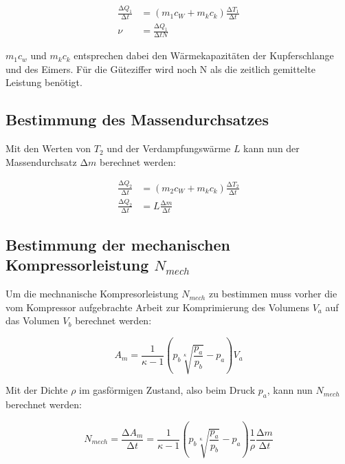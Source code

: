 \begin{align}
  \label{eqn:Gueteziffer}
  \frac{\increment Q_1}{\increment t} &= (m_1c_W + m_kc_k) \frac{\increment T_1}{\increment t} \\
  \nu                                 &= \frac{\increment Q_1}{\increment t N}
\end{align}

$m_1c_w$ und $m_kc_k$ entsprechen dabei den Wärmekapazitäten der Kupferschlange und des Eimers.
Für die Güteziffer wird noch N als die zeitlich gemittelte Leistung benötigt.

\subsection{Bestimmung des Massendurchsatzes}

Mit den Werten von $T_2$ und der Verdampfungswärme $L$ kann nun der Massendurchsatz $\increment m $
berechnet werden:

\begin{align}
  \label{eqn:Massendurchsatz}
  \frac{\increment Q_2}{\increment t} &= (m_2 c_W + m_k c_k) \frac{\increment T_2}{\increment t} \\
  \frac{\increment Q_2}{\increment t} &= L \frac{\increment m}{\increment t}
\end{align}

\subsection{Bestimmung der mechanischen Kompressorleistung \texorpdfstring{$N_{mech}$}{t} }

Um die mechnanische Kompresorleistung $N_{mech}$ zu bestimmen muss vorher die vom Kompressor aufgebrachte
Arbeit zur Komprimierung des Volumens $V_a$ auf das Volumen $V_b$ berechnet werden:

\begin{equation}
  \label{eqn:Am}
  A_m = \frac{1}{\kappa - 1} \left( p_b \sqrt[\kappa]{\frac{p_a}{p_b}} - p_a \right) V_a
\end{equation}

Mit der Dichte $\rho$ im gasförmigen Zustand, also beim Druck $p_a$, kann nun $N_{mech}$ berechnet werden:

\begin{equation}
  \label{eqn:Nmech}
  N_{mech} = \frac{\increment A_m}{\increment t} =  \frac{1}{\kappa - 1} \left( p_b \sqrt[\kappa]{\frac{p_a}{p_b}} - p_a \right) \frac{1}{\rho} \frac{\increment m}{\increment t}
\end{equation}

